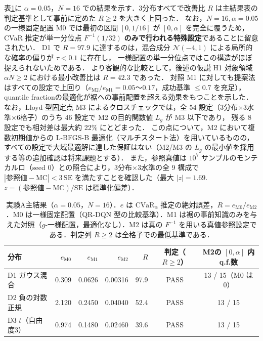 \documentclass[a4paper,10pt]{jsarticle}
\theoremstyle{definition}
\newcommand{\CVaR}{\mathrm{CVaR}}
\newcommand{\Finv}{F^{-1}}
\begin{document}
表\ref{tab:A1}に $\alpha=0.05$，$N=16$ での結果を示す．3分布すべてで改善比 $R$ は主結果表の判定基準として事前に定めた $R\ge2$ を大きく上回った．
なお，$N=16, \alpha=0.05$ の一様固定配置 M0 では最初の区間 $[0, 1/16]$ が $[0, \alpha]$ を完全に覆うため，CVaR 推定が単一分位点 $\Finv(1/32)$ \textbf{のみで行われる特殊設定}であることに留意されたい．
D1 で $R=97.9$ に達するのは，混合成分 $\mathcal N(-4,1)$ による局所的な確率の偏りが $\tau<0.1$ に存在し，
一様配置の単一分位点ではこの構造がほぼ捉えられないためである．
より客観的な比較として，後述の仮説 H1 対象領域 $\alpha N\ge2$ における最小改善比は $R=42.3$ であった．
対照 M1 に対しても提案法はすべての設定で上回り（$e_{\mathrm{M2}}/e_{\mathrm{M1}}=0.05$〜$0.17$，成功基準 $\le0.7$ を充足），
quantile fractionの最適化が裾への事前配置を超える効果をもつことを示した．
なお，Lloyd 型固定点 M3 によるクロスチェックでは，全 54 設定（3分布$\times$3水準$\times$6格子）のうち 46 設定で M2 の目的関数値 $L_g$ が M3 以下であり，
残る 8 設定でも相対差は最大約 22\% にとどまった．
この点について，M2 において複数初期値からの L-BFGS-B 最適化（マルチスタート法）を用いているものの，すべての設定で大域最適解に達した保証はない（M2/M3 の $L_g$ の最小値を採用する等の追加確認は将来課題とする）．
また，参照真値は $10^7$ サンプルのモンテカルロ（seed 0）との照合により，3分布$\times$3水準の全 9 構成で
$|\text{参照値}-\text{MC}|<3\,\mathrm{SE}$ を満たすことを確認した（最大 $|z|=1.69$. $z=(\text{参照値}-\text{MC})/\mathrm{SE}$ は標準化偏差）．

\begin{table}[htbp]
\centering
\caption{実験A主結果（$\alpha=0.05$，$N=16$）．$e$ は $\CVaR_\alpha$ 推定の絶対誤差，$R=e_{\mathrm{M0}}/e_{\mathrm{M2}}$．M0 は一様固定配置（QR-DQN 型の比較基準）．M1 は裾の事前知識のみを与えた対照（$g$-一様配置，最適化なし）．M2 は真の $\Finv$ を用いる真値参照設定である．判定列 $R\ge2$ は全格子での最低基準である．}
\label{tab:A1}
\small
\setlength{\tabcolsep}{5pt}
\begin{tabular}{lrrrrcc}
\toprule
分布 & $e_{\mathrm{M0}}$ & $e_{\mathrm{M1}}$ & $e_{\mathrm{M2}}$ & $R$ & 判定（$R\ge2$） & M2の $[0,\alpha]$ 内q.f.数\\
\midrule
D1 ガウス混合 & 0.309 & 0.0626 & 0.00316 & 97.9 & PASS & 13 / 15（M0 は 0）\\
D2 負の対数正規 & 2.120 & 0.2450 & 0.04040 & 52.4 & PASS & 13 / 15\\
D3 $t$（自由度3） & 0.974 & 0.1480 & 0.02460 & 39.6 & PASS & 13 / 15\\
\bottomrule
\end{tabular}
\end{table}
\end{document}
